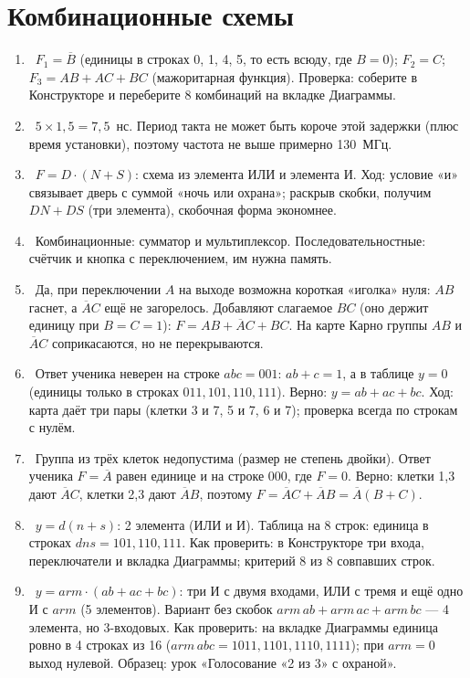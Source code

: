 \section*{Комбинационные схемы}
\begin{enumerate}
  \item {}~$F_1=\overline{B}$ (единицы в строках 0, 1, 4, 5, то есть всюду, где $B=0$); $F_2=C$; $F_3=AB+AC+BC$ (мажоритарная функция). Проверка: соберите в Конструкторе и переберите 8 комбинаций на вкладке Диаграммы.
  \item {}~$5\times 1{,}5=7{,}5$~нс. Период такта не может быть короче этой задержки (плюс время установки), поэтому частота не выше примерно 130~МГц.
  \item {}~$F = D\cdot(N+S)$: схема из элемента ИЛИ и элемента И. Ход: условие «и» связывает дверь с суммой «ночь или охрана»; раскрыв скобки, получим $DN+DS$ (три элемента), скобочная форма экономнее.
  \item {}~Комбинационные: сумматор и мультиплексор. Последовательностные: счётчик и кнопка с переключением, им нужна память.
  \item {}~Да, при переключении $A$ на выходе возможна короткая «иголка» нуля: $AB$ гаснет, а $\overline{A}C$ ещё не загорелось. Добавляют слагаемое $BC$ (оно держит единицу при $B=C=1$): $F = AB + \overline{A}C + BC$. На карте Карно группы $AB$ и $\overline{A}C$ соприкасаются, но не перекрываются.
  \item {}~Ответ ученика неверен на строке $abc=001$: $ab+c=1$, а в таблице $y=0$ (единицы только в строках $011,101,110,111$). Верно: $y=ab+ac+bc$. Ход: карта даёт три пары (клетки 3 и 7, 5 и 7, 6 и 7); проверка всегда по строкам с нулём.
  \item {}~Группа из трёх клеток недопустима (размер не степень двойки). Ответ ученика $F=\overline{A}$ равен единице и на строке $000$, где $F=0$. Верно: клетки 1,3 дают $\overline{A}C$, клетки 2,3 дают $\overline{A}B$, поэтому $F=\overline{A}C+\overline{A}B=\overline{A}(B+C)$.
  \item {}~$y=d(n+s)$: 2 элемента (ИЛИ и И). Таблица на 8 строк: единица в строках $dn s=101,110,111$. Как проверить: в Конструкторе три входа, переключатели и вкладка Диаграммы; критерий 8 из 8 совпавших строк.
  \item {}~$y=arm\cdot(ab+ac+bc)$: три И с двумя входами, ИЛИ с тремя и ещё одно И с $arm$ (5 элементов). Вариант без скобок $arm\,ab+arm\,ac+arm\,bc$ --- 4 элемента, но 3-входовых. Как проверить: на вкладке Диаграммы единица ровно в 4 строках из 16 ($arm\,abc=1011,1101,1110,1111$); при $arm=0$ выход нулевой. Образец: урок «Голосование «2 из 3» с охраной».

\end{enumerate}
